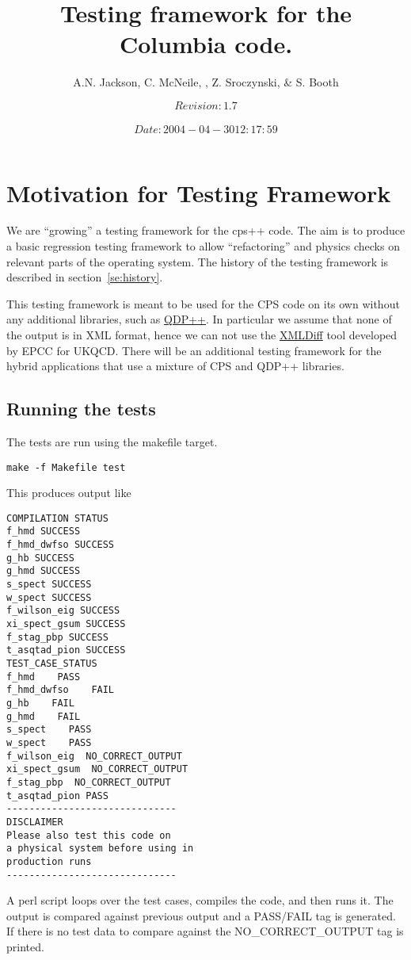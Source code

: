 \documentclass[12pt]{article}
\title{Testing framework for the Columbia code.}
\author{A.N. Jackson, C. McNeile, , Z. Sroczynski,  \& S. Booth}
\date{\mbox{\small $$Revision: 1.7 $$  $$Date: 2004-04-30 12:17:59 $$}}
\begin{document}
\maketitle

\tableofcontents
\newpage

\section{Motivation for Testing Framework}

We are ``growing'' a testing framework for the cps++ code.
The aim is to produce a basic regression testing framework to allow
``refactoring'' and physics checks on relevant parts of the operating
system.
The history of the testing framework is described in 
section~\ref{se:history}.


This testing framework is meant to be used for the CPS code on its own
without any additional libraries, such as 
\href{http://www.jlab.org/~edwards/qdp/}{QDP++}.
  In particular we
assume that none of the output is in XML format, hence we can not use the
\href{https://forge.nesc.ac.uk/projects/xmldiff/}{XMLDiff}
tool developed by EPCC for UKQCD.  There will be an additional
testing framework for the hybrid applications that use a mixture of
CPS and QDP++ libraries.

\subsection{Running the tests}

The tests are run using the makefile target.
\begin{verbatim}
make -f Makefile test
\end{verbatim}
This produces output like
\begin{verbatim}
COMPILATION STATUS
f_hmd SUCCESS
f_hmd_dwfso SUCCESS
g_hb SUCCESS
g_hmd SUCCESS
s_spect SUCCESS
w_spect SUCCESS
f_wilson_eig SUCCESS
xi_spect_gsum SUCCESS
f_stag_pbp SUCCESS
t_asqtad_pion SUCCESS
TEST_CASE_STATUS
f_hmd    PASS
f_hmd_dwfso    FAIL
g_hb    FAIL
g_hmd    FAIL
s_spect    PASS
w_spect    PASS
f_wilson_eig  NO_CORRECT_OUTPUT
xi_spect_gsum  NO_CORRECT_OUTPUT
f_stag_pbp  NO_CORRECT_OUTPUT
t_asqtad_pion PASS
------------------------------
DISCLAIMER
Please also test this code on
a physical system before using in
production runs
------------------------------
\end{verbatim}

A perl script loops over the test cases, compiles the code,
and then runs it. The output is compared against
previous output and a PASS/FAIL tag is generated.
If there is no test data to compare against the
NO\_CORRECT\_OUTPUT tag is printed.
\end{document}
